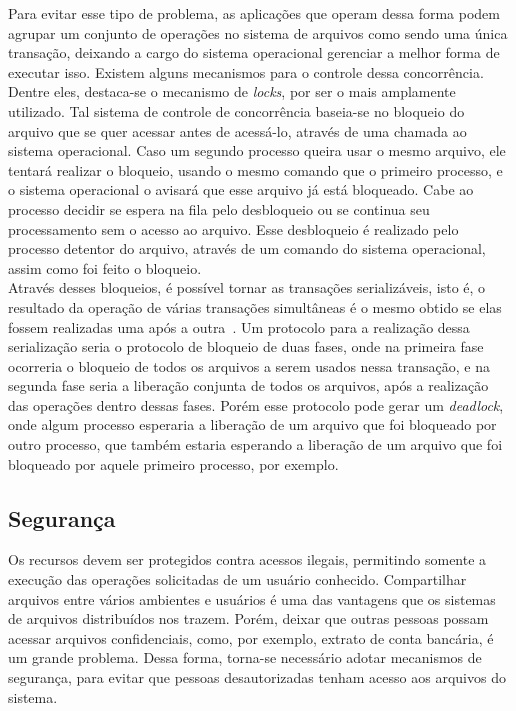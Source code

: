 	Para evitar esse tipo de problema, as aplicações que operam dessa forma podem agrupar um conjunto de operações no sistema de arquivos como sendo uma única transação, deixando a cargo do sistema operacional gerenciar a melhor forma de executar isso.
	Existem alguns mecanismos para o controle dessa concorrência. Dentre eles, destaca-se o mecanismo de \textit{locks}, por ser o mais amplamente utilizado. Tal sistema de controle de concorrência baseia-se no bloqueio do arquivo que se quer acessar antes de acessá-lo, através de uma chamada ao sistema operacional. Caso um segundo processo queira usar o mesmo arquivo, ele tentará realizar o bloqueio, usando o mesmo comando que o primeiro processo, e o sistema operacional o avisará que esse arquivo já está bloqueado. Cabe ao processo decidir se espera na fila pelo desbloqueio ou se continua seu processamento sem o acesso ao arquivo. Esse desbloqueio é realizado pelo processo detentor do arquivo, através de um comando do sistema operacional, assim
	como foi feito o bloqueio.\\
	
	Através desses bloqueios, é possível tornar as transações serializáveis, isto é, o resultado da operação de várias transações simultâneas é o mesmo obtido se elas fossem realizadas uma após a outra~\cite{kon94}. Um protocolo para a realização dessa serialização seria o protocolo de bloqueio de duas fases, onde na primeira fase ocorreria o bloqueio de todos os arquivos a serem usados nessa transação, e na segunda fase seria a liberação conjunta de todos os arquivos, após a realização das operações dentro dessas fases.
	Porém esse protocolo pode gerar um \textit{deadlock}, onde algum processo esperaria a liberação de um arquivo que foi bloqueado por outro processo, que também estaria esperando a liberação de um arquivo que foi bloqueado por aquele primeiro processo, por exemplo.
	
	\subsection{Segurança}
	Os recursos devem ser protegidos contra acessos ilegais, permitindo somente a execução das operações solicitadas de um usuário conhecido. 
	Compartilhar arquivos entre vários ambientes e usuários é uma das vantagens que os sistemas de arquivos distribuídos nos trazem. Porém, deixar que outras pessoas possam acessar arquivos confidenciais, como, por exemplo, extrato de conta bancária, é um grande problema. 
	Dessa forma, torna-se necessário adotar mecanismos de segurança, para evitar que pessoas desautorizadas tenham acesso aos arquivos do sistema. 
	\\
	
